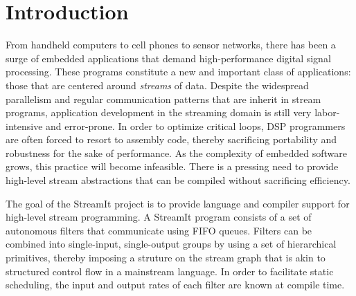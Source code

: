 \section{Introduction}

From handheld computers to cell phones to sensor networks, there has
been a surge of embedded applications that demand high-performance
digital signal processing.  These programs constitute a new and
important class of applications: those that are centered around {\it
streams} of data.  Despite the widespread parallelism and regular
communication patterns that are inherit in stream programs,
application development in the streaming domain is still very
labor-intensive and error-prone.  In order to optimize critical loops,
DSP programmers are often forced to resort to assembly code, thereby
sacrificing portability and robustness for the sake of performance.
As the complexity of embedded software grows, this practice will
become infeasible.  There is a pressing need to provide high-level
stream abstractions that can be compiled without sacrificing
efficiency.

The goal of the StreamIt project is to provide language and compiler
support for high-level stream programming.  A StreamIt program
consists of a set of autonomous filters that communicate using FIFO
queues.  Filters can be combined into single-input, single-output
groups by using a set of hierarchical primitives, thereby imposing a
struture on the stream graph that is akin to structured control flow
in a mainstream language.  In order to facilitate static scheduling,
the input and output rates of each filter are known at compile time.

